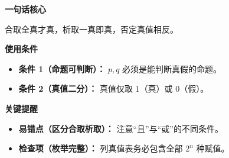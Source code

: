 \begin{summarybox}
	\textbf{\textcolor{CSummary}{一句话核心}}

	合取全真才真，析取一真即真，否定真值相反。

	\medskip
	\textbf{\textcolor{CSummary}{使用条件}}
	\begin{itemize}[leftmargin=*, itemsep=0.5em, topsep=0.4em]
		\item \textbf{条件 1（命题可判断）：} $p,q$ 必须是能判断真假的命题。
		\item \textbf{条件 2（真值二分）：} 真值仅取 $1$（真）或 $0$（假）。
	\end{itemize}

	\medskip
	\textbf{\textcolor{CSummary}{关键提醒}}
	\begin{itemize}[leftmargin=*, itemsep=0.5em, topsep=0.4em]
		\item \textbf{易错点（区分合取析取）：} 注意“且”与“或”的不同条件。
		\item \textbf{检查项（枚举完整）：} 列真值表务必包含全部 $2^n$ 种赋值。
	\end{itemize}
\end{summarybox}
